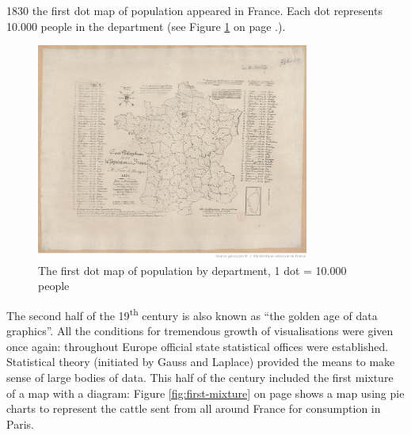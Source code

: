 1830 the first dot map of population appeared in France. Each dot represents 10.000 people in the department (see Figure \ref{fig:first-dotmap} on page \pageref{fig:first-dotmap}.).

\begin{figure}[!htb]
\centering
\includegraphics[width=0.8\textwidth,keepaspectratio]{images/history/montizon-dotmap2.jpeg}
\caption[
    The first dot map of population by department, 1 dot = 10.000 people, Urldate: 07.2016 \newline
\small\texttt{\url{http://gallica.bnf.fr/ark:/12148/btv1b8492261j/f1.highres}}
]{The first dot map of population by department, 1 dot = 10.000 people}
\label{fig:first-dotmap}
\end{figure}

The second half of the 19\textsuperscript{th} century is also known as ``the golden age of data graphics''. All the conditions for tremendous growth of visualisations were given once again: throughout Europe official state statistical offices were established.
Statistical theory (initiated by Gauss and Laplace) provided the means to make sense of large bodies of data.
This half of the century included the first mixture of a map with a diagram: Figure \ref{fig:first-mixture} on page \pageref{fig:first-mixture} shows a map using pie charts to represent the cattle sent from all around France for consumption in Paris.

